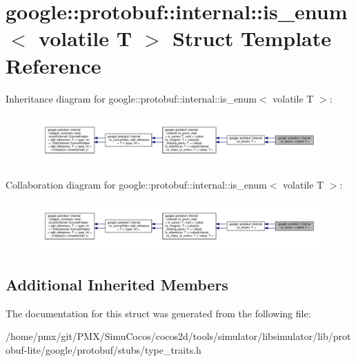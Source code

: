 \hypertarget{structgoogle_1_1protobuf_1_1internal_1_1is__enum_3_01volatile_01T_01_4}{}\section{google\+:\+:protobuf\+:\+:internal\+:\+:is\+\_\+enum$<$ volatile T $>$ Struct Template Reference}
\label{structgoogle_1_1protobuf_1_1internal_1_1is__enum_3_01volatile_01T_01_4}


Inheritance diagram for google\+:\+:protobuf\+:\+:internal\+:\+:is\+\_\+enum$<$ volatile T $>$\+:
\nopagebreak
\begin{figure}[H]
\begin{center}
\leavevmode
\includegraphics[width=350pt]{structgoogle_1_1protobuf_1_1internal_1_1is__enum_3_01volatile_01T_01_4__inherit__graph}
\end{center}
\end{figure}


Collaboration diagram for google\+:\+:protobuf\+:\+:internal\+:\+:is\+\_\+enum$<$ volatile T $>$\+:
\nopagebreak
\begin{figure}[H]
\begin{center}
\leavevmode
\includegraphics[width=350pt]{structgoogle_1_1protobuf_1_1internal_1_1is__enum_3_01volatile_01T_01_4__coll__graph}
\end{center}
\end{figure}
\subsection*{Additional Inherited Members}


The documentation for this struct was generated from the following file\+:\begin{DoxyCompactItemize}
\item 
/home/pmx/git/\+P\+M\+X/\+Simu\+Cocos/cocos2d/tools/simulator/libsimulator/lib/protobuf-\/lite/google/protobuf/stubs/type\+\_\+traits.\+h\end{DoxyCompactItemize}
